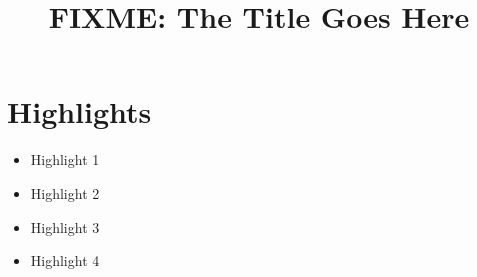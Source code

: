 \documentclass[review]{elsarticle}
\begin{document}
\begin{frontmatter}
\title{FIXME: The Title Goes Here}
\end{frontmatter}
\section*{Highlights}
\begin{itemize}
       \item Highlight 1 
       \item Highlight 2
       \item Highlight 3
       \item Highlight 4
\end{itemize}
\end{document}
